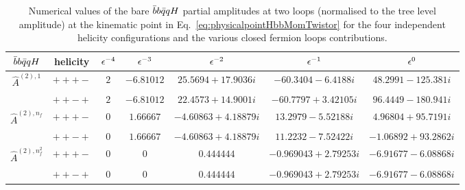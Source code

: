 \documentclass[main.tex]{subfiles}
\begin{document}
\begin{table}[t!]
\centering
\begin{tabularx}{1.0\textwidth}{|C{0.7}|C{0.8}|C{0.6}|C{1.2}|C{1.2}|C{1.2}|C{1.3}|}
\hline
 $\bar{b}b\bar{q}qH$     & helicity & $\epsilon^{-4}$ & $\epsilon^{-3}$ & $\epsilon^{-2}$ & $\epsilon^{-1}$ & $\epsilon^{0}$ \\
\hline
$\hat A^{(2),1}$ & $+++-$ & $ 2 $ & $ -6.81012$ & $ 25.5694 + 17.9036 i$ & $ -60.3404 - 6.4188 i$ & $ 48.2991 - 125.381 i $ \\
                 & $++-+$ & $ 2 $ & $ -6.81012$ & $ 22.4573 + 14.9001 i$ & $ -60.7797 + 3.42105 i$ & $ 96.4449 - 180.941 i $ \\
\hline
$\hat A^{(2),n_f}$ & $+++-$ & $ 0$ & $ 1.66667$ & $ -4.60863 + 4.18879 i$ & $ 13.2979 - 5.52188 i$ & $ 4.96804 + 95.7191 i $ \\
                   & $++-+$ & $ 0$ & $ 1.66667$ & $ -4.60863 + 4.18879 i$ & $ 11.2232 - 7.52422 i$ & $ -1.06892 + 93.2862 i $ \\
\hline
$\hat A^{(2),n_f^2}$ & $+++-$ & $ 0$ & $ 0$ & $ 0.444444$ & $ -0.969043 + 2.79253 i$ & $ -6.91677 - 6.08868 i $ \\
                     & $++-+$ & $ 0$ & $ 0$ & $ 0.444444$ & $ -0.969043 + 2.79253 i$ & $ -6.91677 - 6.08868 i $ \\
\hline
\end{tabularx}
\caption{\label{tab:benchmark2q2bHbare} Numerical values of the bare $\bar{b}b\bar{q}qH$ partial amplitudes at two loops (normalised to the tree level amplitude) at the kinematic point in Eq.~\ref{eq:physicalpointHbbMomTwistor} for the four independent helicity configurations and the various closed fermion loops contributions. }
\end{table}
\end{document}

